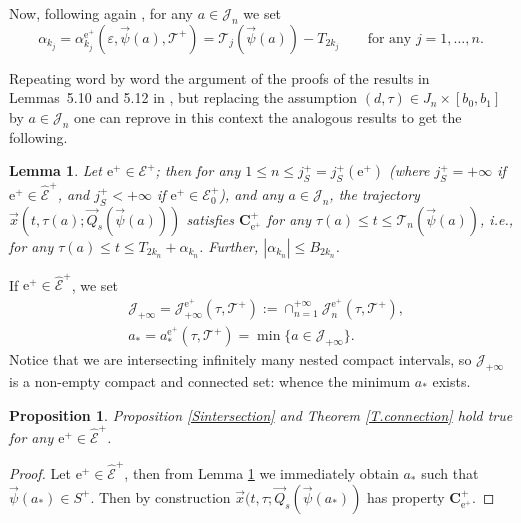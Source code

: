 \documentclass[10pt]{article}
\numberwithin{equation}{section}
\def\al{\alpha}
\def\ep{\varepsilon}
\def\ee{{\mathrm e}}
\def\EE{{\mathcal E}}
\def\TT{{\mathcal T}}
\def\TTT{\mathscr{T}}
\def\Q{\vec{Q}}
\def\x{\vec{x}}
\newcommand\bs[1]{{\boldsymbol{#1}}}
\newtheorem{proposition}[theorem]{Proposition}
\newtheorem{lemma}[theorem]{Lemma}
\theoremstyle{definition}
\theoremstyle{remark}
\begin{document}
Now, following again \cite[\S 5.1.1]{CFPrestate},  for any $a \in \mathcal{J}_n$ we set
  \begin{equation}\label{caldefaln}
    \al_{k_j}=\al_{k_j}^{\ee^+}(\ep,\vec{\psi}(a), \TT^+)= \TTT_j(\vec{\psi}(a))- T_{2k_j}  \qquad \textrm{for any $j=1, \ldots, n$.}
  \end{equation}




Repeating word by word the argument of the proofs of the results in Lemmas~5.10  and
 5.12    in \cite{CFPrestate},   but replacing the assumption $(d,\tau) \in J_n \times [b_0,b_1]$ by
 $a \in \mathcal{J}_n$ one can reprove in this context the analogous results to get the following.

\begin{lemma}\label{call.stepn}
Let $\ee^+ \in \EE^+$; then for any $1 \le n \le  j^+_S=j^+_S (\ee^+)$ (where $j^+_S=+\infty$ if $\ee^+ \in \hat{\EE}^+$, and $j^+_S<+\infty$
if
$\ee^+ \in
\EE^+_0$), and
  any $a \in \mathcal{J}_n$, the trajectory $\x(t,\tau(a); \Q_s(\vec{\psi}(a)))$ satisfies $\bs{C^+_{\ee^+}}$ for any $\tau(a) \le t \le
  \TTT_n(\vec{\psi}(a))$,
  i.e., for any $\tau(a) \le t \le T_{2 k_n} +\al_{k_n}$.
  Further,    $|\al_{k_n}| \le B_{2k_n}$.
\end{lemma}

If $\ee^+ \in \hat{\EE}^+$, we set
\begin{equation}\label{Jinftypsi}
\begin{split}
  &\mathcal{J_{+\infty}} = \mathcal{J}^{\ee^+}_{+\infty}(\tau, \TT^+):= \cap_{n=1}^{+\infty}\mathcal{J}_n^{\ee^+}(\tau, \TT^+) , \\
   & a_*=a_*^{\ee^+}(\tau, \TT^+)= \min \{a \in \mathcal{J}_{+\infty}\}.
  \end{split}
\end{equation}
Notice that  we are intersecting infinitely many nested compact intervals, so $\mathcal{J_{+\infty} }$
is a  non-empty compact and connected set: whence the minimum $a_*$ exists.




\begin{proposition}\label{Sintersectionhat}
 Proposition  \ref{Sintersection} and Theorem \ref{T.connection}  hold true for any $\ee^+ \in \hat{\EE}^+$.
\end{proposition}
 \begin{proof}
 Let $\ee^+ \in \hat{\EE}^+$, then from Lemma \ref{call.stepn} we immediately obtain $a_*$ such that $\vec{\psi}(a_*) \in S^+$.
 Then by construction $\x(t,\tau; \Q_s(\vec{\psi}(a_*))$ has property $\bs{C_{\ee^+}^+}$.
 \end{proof}
\end{document}
